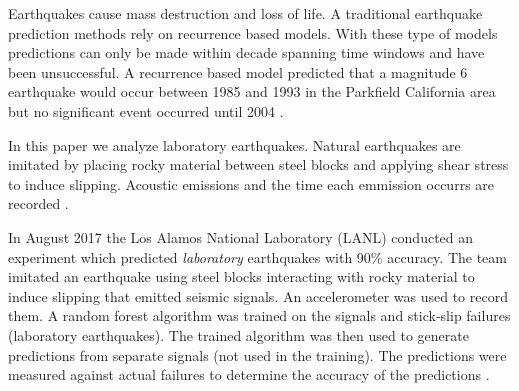 \documentclass[]{llncs}
\begin{document}
Earthquakes cause mass destruction and loss of life. A traditional earthquake prediction methods rely on recurrence based models. With these type of models predictions can only be made within decade spanning time windows and have been unsuccessful. A recurrence based model predicted that a magnitude 6 earthquake would occur between 1985 and 1993 in the Parkfield California area but no significant event occurred until 2004 \cite{Jackson}.
 \par

In this paper we analyze laboratory earthquakes. Natural earthquakes are imitated by placing rocky material between steel blocks and applying shear stress to induce slipping. Acoustic emissions and the time each emmission occurrs are recorded \cite{Bertrand}.\par




In August 2017 the Los Alamos National Laboratory (LANL) conducted an experiment %
 which predicted \emph{laboratory} earthquakes with 90\% accuracy. The team imitated an earthquake using steel blocks interacting with rocky material to induce slipping that emitted seismic signals. An accelerometer was used to record them. A random forest algorithm was trained on the signals and stick‐slip failures (laboratory earthquakes). The trained algorithm was then used to generate predictions from separate signals (not used in the training). The predictions were measured against actual failures to determine the accuracy of the predictions \cite{LANLNews}.\par
\end{document}
